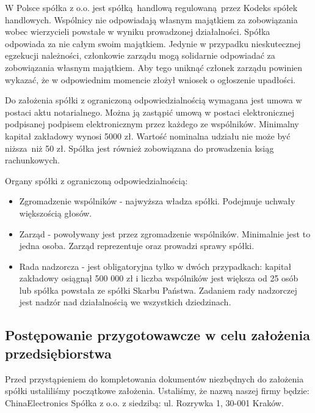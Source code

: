 W Polsce spółka z o.o. jest spółką handlową regulowaną przez Kodeks spółek handlowych. Wspólnicy nie odpowiadają własnym majątkiem za zobowiązania wobec wierzycieli powstałe w wyniku prowadzonej działalności. Spółka odpowiada za nie całym swoim majątkiem. Jedynie w przypadku nieskutecznej egzekucji należności, członkowie zarządu mogą solidarnie odpowiadać za zobowiązania własnym majątkiem. Aby tego uniknąć członek zarządu powinien wykazać, że w odpowiednim momencie złożył wniosek o ogłoszenie upadłości. 

Do założenia spółki z ograniczoną odpowiedzialnością wymagana jest umowa w postaci aktu notarialnego. Można ją zastąpić umową w postaci elektronicznej podpisanej podpisem elektronicznym przez każdego ze wspólników. Minimalny kapitał zakładowy wynosi 5000 zł. Wartość nominalna udziału nie może być niższa niż 50 zł. Spółka jest również zobowiązana do prowadzenia ksiąg rachunkowych.

Organy spółki z ograniczoną odpowiedzialnością:
\begin{itemize}
	\item Zgromadzenie wspólników - najwyższa władza spółki. Podejmuje uchwały większością głosów. 
	\item Zarząd - powoływany jest przez zgromadzenie wspólników. Minimalnie jest to jedna osoba. Zarząd reprezentuje oraz prowadzi sprawy spółki. 
	\item Rada nadzorcza - jest obligatoryjna tylko w dwóch przypadkach: kapitał zakładowy osiągnął 500 000 zł i liczba wspólników jest większa od 25 osób lub spółka powstała ze spółki Skarbu Państwa. Zadaniem rady nadzorczej jest nadzór nad działalnością we wszystkich dziedzinach.
\end{itemize}

\subsection{Postępowanie przygotowawcze w celu założenia przedsiębiorstwa}
Przed przystąpieniem do kompletowania dokumentów niezbędnych do założenia spółki ustaliliśmy początkowe założenia. Ustaliśmy, że nazwą naszej firmy będzie: ChinaElectronics Spółka z o.o. z siedzibą: ul. Rozrywka 1, 30-001 Kraków. 